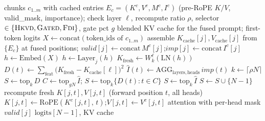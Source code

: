 \begin{algorithm}[t]
\caption{Importance-Guided Blending (online, per query)}\label{alg:blend}
\begin{algorithmic}[1]
\Require chunks $c_{1..m}$ with cached entries $E_c=(K^c,V^c,M^c,I^c)$ (pre-RoPE $K/V$, valid\_mask, importance);
         check layer $\ell$, recompute ratio $\rho$, selector $\in\{\textsc{Hkvd},\textsc{Gated},\textsc{Fdi}\}$, gate pct $g$
\Ensure blended KV cache for the fused prompt; first-token logits
\State $X \gets \mathrm{concat}(\text{token\_ids of }c_{1..m})$ 
\State assemble $K_{\mathrm{cache}}[j],V_{\mathrm{cache}}[j]$ from $\{E_c\}$ at fused positions;
\State $\mathit{valid}[j]\gets\mathrm{concat}\,M^c[j]$;\quad $\mathit{imp}[j]\gets\mathrm{concat}\,I^c[j]$ \EndFor
\State $h\gets\mathrm{Embed}(X)$
\State $h\gets\mathrm{Layer}_j(h)$ \EndFor
\State $K_{\mathrm{fresh}}\gets W_k^{\ell}(\mathrm{LN}(h))$ 
\State $D(t)\gets\sum_{\mathrm{feat}}\big(K_{\mathrm{fresh}}-K_{\mathrm{cache}}[\ell]\big)^2$ 
\State $\widehat I(t)\gets\mathrm{AGG}_{\mathrm{layers,heads}}\,\mathit{imp}(t)$ 
\State $k\gets\lceil\rho N\rceil$
 $S\gets\mathrm{top}_k\,D$
 $C\gets\mathrm{top}_{gN}\,\widehat I$;\; $S\gets\mathrm{top}_k\{D(t):t\in C\}$
 $S\gets\mathrm{top}_k\,\widehat I$ 
\EndIf
\State $S\gets S\cup\{N{-}1\}$ 
 
  \State recompute fresh $K[j,t],V[j,t]$ (forward position $t$, all heads)\EndFor
  \State $K[j,t]\gets\mathrm{RoPE}(K^c[j,t],\,t)$;\quad $V[j,t]\gets V^c[j,t]$\EndFor
  \State attention with per-head mask $\mathit{valid}[j]$ 
\EndFor
\State \Return $\mathrm{logits}[N{-}1]$, KV cache
\end{algorithmic}
\end{algorithm}

